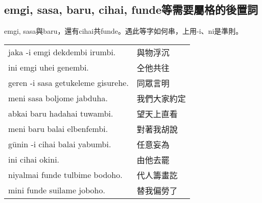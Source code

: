 \documentclass{article}
\begin{document}
\subsection{emgi, sasa, baru, cihai, funde等需要屬格的後置詞}
\noindent emgi, sasa與baru，還有cihai共funde。遇此等字如何串，上用-i、ni是準則。
\begin{center}
    \begin{tabularx}{\textwidth}{XX}
        jaka -i emgi dekdembi irumbi. & 與物浮沉\\
        ini emgi uhei genembi. & 仝他共往\\
        geren -i sasa getukeleme gisurehe. & 同眾言明\\
        meni sasa boljome jabduha. & 我們大家約定\\
        abkai baru hadahai tuwambi. & 望天上直看\\
        meni baru balai elbenfembi. & 對著我胡說\\
        g\={u}nin -i cihai balai yabumbi. & 任意妄為\\
        ini cihai okini. & 由他去罷\\
        niyalmai funde tulbime bodoho. & 代人籌畫訖\\
        mini funde suilame joboho. & 替我偏勞了
    \end{tabularx}
\end{center}
\end{document}
